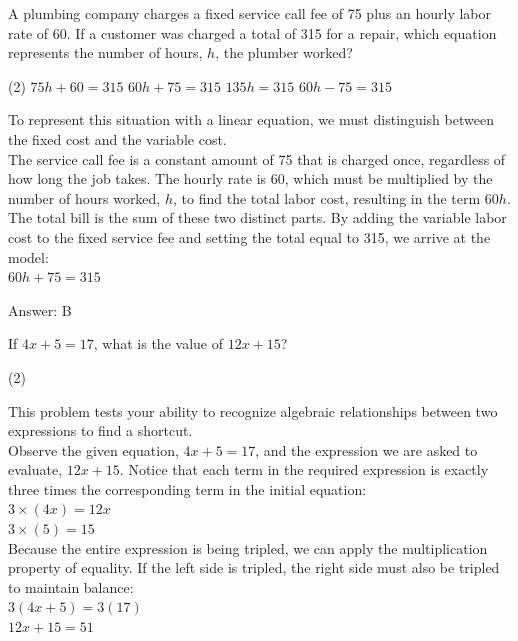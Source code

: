 \documentclass[11pt,paper=a4,answers]{exam}
\begin{document}
\begin{questions}
\pointsinrightmargin
\pointsdroppedatright
\marksnotpoints
{}
\pointformat{\boldmath\themarginpoints}
\bracketedpoints

%
\question
A plumbing company charges a fixed service call fee of 75 plus an hourly labor rate of 60. If a customer was charged a total of 315 for a repair, which equation represents the number of hours, $h$, the plumber worked?
\begin{tasks}(2)
    \task $75h + 60 = 315$
    \task $60h + 75 = 315$
    \task $135h = 315$
    \task $60h - 75 = 315$
\end{tasks}

\begin{solution}
To represent this situation with a linear equation, we must distinguish between the fixed cost and the variable cost. 
\\[10pt]
The service call fee is a constant amount of 75 that is charged once, regardless of how long the job takes. The hourly rate is 60, which must be multiplied by the number of hours worked, $h$, to find the total labor cost, resulting in the term $60h$. 
\\[10pt]
The total bill is the sum of these two distinct parts. By adding the variable labor cost to the fixed service fee and setting the total equal to 315, we arrive at the model:
\\[10pt]
$60h + 75 = 315$

\vspace{20pt}
Answer: \colorbox{yellow!100}{B}
\end{solution}

\question
If $4x + 5 = 17$, what is the value of $12x + 15$?
\begin{tasks}(2)
\end{tasks}

\begin{solution}
This problem tests your ability to recognize algebraic relationships between two expressions to find a shortcut. 
\\[10pt]
Observe the given equation, $4x + 5 = 17$, and the expression we are asked to evaluate, $12x + 15$. Notice that each term in the required expression is exactly three times the corresponding term in the initial equation:
\\[10pt]
$3 \times (4x) = 12x$ \\
$3 \times (5) = 15$ 
\\[10pt]
Because the entire expression is being tripled, we can apply the multiplication property of equality. If the left side is tripled, the right side must also be tripled to maintain balance:
\\[10pt]
$3(4x + 5) = 3(17)$ \\
$12x + 15 = 51$


\end{solution}
\end{questions}
\end{document}
